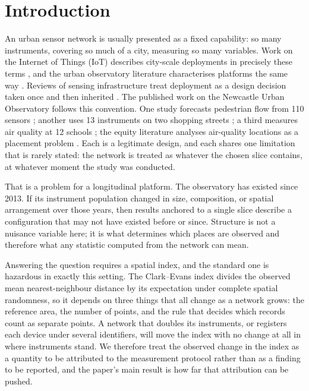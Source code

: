 \documentclass{article}
\begin{document}
\maketitle

\section{Introduction}
\label{sec:intro}

An urban sensor network is usually presented as a fixed capability: so many
instruments, covering so much of a city, measuring so many variables. Work on the
Internet of Things (IoT) describes city-scale deployments in precisely these terms
\cite{kumar2024sense,jamshed2022challenges,zeng2024sensors,xu2024getting}, and the urban
observatory literature characterises platforms the same way
\cite{hamed2025comparison,yu2025toward,davern2023liveability}. Reviews of sensing
infrastructure treat deployment as a design decision taken once and
then inherited \cite{osamy2022coverage}. The
published work on the Newcastle Urban Observatory follows this convention. One study
forecasts
pedestrian flow from 110 sensors \cite{morriswiltshire2026}; another uses 13 instruments
on two shopping streets \cite{komar2026}; a third measures air quality at 12 schools
\cite{keast2022}; the equity literature analyses air-quality locations as a placement
problem
\cite{robinson2021sensor,robinson2022optimizing,zhai2025cost,lin2025optimizing,ziedabozied2024spatial}.
Each is a legitimate design,
and each shares one limitation that is rarely stated: the network is treated as
whatever the chosen slice contains, at whatever moment the study was conducted.

That is a problem for a longitudinal platform. The observatory has existed since 2013.
If its instrument population changed in size, composition, or spatial arrangement over
those years, then results anchored to a single slice describe a configuration that may
not have existed before or since. Structure is not a nuisance variable here; it is what
determines which places are observed and therefore what any statistic computed from the
network can mean.

Answering the question requires a spatial index, and the standard one is hazardous in exactly
this setting. The Clark--Evans index divides the observed mean nearest-neighbour distance by its
expectation under complete spatial randomness, so it depends on three things that all change as
a network grows: the reference area, the number of points, and the rule that decides which
records count as separate points. A network that doubles its instruments, or registers each
device under several identifiers, will move the index with no change at all in where instruments
stand. We therefore treat the observed change in the index as a quantity to be attributed to the
measurement protocol rather than as a finding to be reported, and the paper's main result is how
far that attribution can be pushed.
\end{document}
